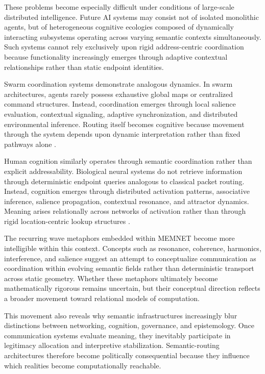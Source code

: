 \documentclass[11pt,a4paper]{article}
\begin{document}
These problems become especially difficult under conditions of large-scale distributed intelligence. Future AI systems may consist not of isolated monolithic agents, but of heterogeneous cognitive ecologies composed of dynamically interacting subsystems operating across varying semantic contexts simultaneously. Such systems cannot rely exclusively upon rigid address-centric coordination because functionality increasingly emerges through adaptive contextual relationships rather than static endpoint identities.

Swarm coordination systems demonstrate analogous dynamics. In swarm architectures, agents rarely possess exhaustive global maps or centralized command structures. Instead, coordination emerges through local salience evaluation, contextual signaling, adaptive synchronization, and distributed environmental inference. Routing itself becomes cognitive because movement through the system depends upon dynamic interpretation rather than fixed pathways alone \cite{bonabeau1999}.

Human cognition similarly operates through semantic coordination rather than explicit addressability. Biological neural systems do not retrieve information through deterministic endpoint queries analogous to classical packet routing. Instead, cognition emerges through distributed activation patterns, associative inference, salience propagation, contextual resonance, and attractor dynamics. Meaning arises relationally across networks of activation rather than through rigid location-centric lookup structures \cite{hutchins1995}.

The recurring wave metaphors embedded within MEMNET become more intelligible within this context. Concepts such as resonance, coherence, harmonics, interference, and salience suggest an attempt to conceptualize communication as coordination within evolving semantic fields rather than deterministic transport across static geometry. Whether these metaphors ultimately become mathematically rigorous remains uncertain, but their conceptual direction reflects a broader movement toward relational models of computation.

This movement also reveals why semantic infrastructures increasingly blur distinctions between networking, cognition, governance, and epistemology. Once communication systems evaluate meaning, they inevitably participate in legitimacy allocation and interpretive stabilization. Semantic-routing architectures therefore become politically consequential because they influence which realities become computationally reachable.
\end{document}
